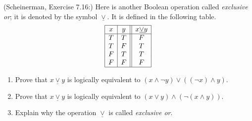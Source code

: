 \documentclass{article}
\theoremstyle{definition}
\newcommand{\xor}{\underline{\lor}}
\begin{document}
\begin{question}
   (Scheinerman, Exercise 7.16:)
Here is another Boolean operation called \textit{exclusive or}; it is denoted by the symbol $\xor$. It is defined in the following table.
	\[\begin{array}{| c | c || c |}
	\hline
	x & y & x \xor y \\
	\hline
	T & T & F \\ 
	T & F & T \\
	F & T & T \\
	F & F & F \\
	\hline
	\end{array}\]
    \begin{enumerate}
        \item Prove that $x \xor y$ is logically equivalent to $(x \wedge \neg y) \vee ((\neg x) \wedge y)$.
        \item Prove that $x \xor y$ is logically equivalent to $(x \vee y) \wedge (\neg (x \wedge y))$.
        \item Explain why the operation $\xor$ is called \textit{exclusive or}.
    \end{enumerate}
\end{question}
\end{document}
